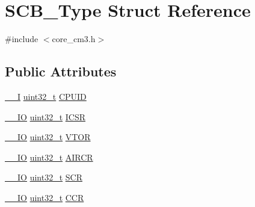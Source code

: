 \hypertarget{struct_s_c_b___type}{}\section{S\+C\+B\+\_\+\+Type Struct Reference}
\label{struct_s_c_b___type}


{\ttfamily \#include $<$core\+\_\+cm3.\+h$>$}

\subsection*{Public Attributes}
\begin{DoxyCompactItemize}
\item 
\hyperlink{group___c_m_s_i_s___c_m3__core__definitions_gaf63697ed9952cc71e1225efe205f6cd3}{\+\_\+\+\_\+I} \hyperlink{_p_e___types_8h_a33594304e786b158f3fb30289278f5af}{uint32\+\_\+t} \hyperlink{struct_s_c_b___type_afa7a9ee34dfa1da0b60b4525da285032}{C\+P\+U\+ID}
\item 
\hyperlink{group___c_m_s_i_s___c_m3__core__definitions_gaec43007d9998a0a0e01faede4133d6be}{\+\_\+\+\_\+\+IO} \hyperlink{_p_e___types_8h_a33594304e786b158f3fb30289278f5af}{uint32\+\_\+t} \hyperlink{struct_s_c_b___type_a3e66570ab689d28aebefa7e84e85dc4a}{I\+C\+SR}
\item 
\hyperlink{group___c_m_s_i_s___c_m3__core__definitions_gaec43007d9998a0a0e01faede4133d6be}{\+\_\+\+\_\+\+IO} \hyperlink{_p_e___types_8h_a33594304e786b158f3fb30289278f5af}{uint32\+\_\+t} \hyperlink{struct_s_c_b___type_a0faf96f964931cadfb71cfa54e051f6f}{V\+T\+OR}
\item 
\hyperlink{group___c_m_s_i_s___c_m3__core__definitions_gaec43007d9998a0a0e01faede4133d6be}{\+\_\+\+\_\+\+IO} \hyperlink{_p_e___types_8h_a33594304e786b158f3fb30289278f5af}{uint32\+\_\+t} \hyperlink{struct_s_c_b___type_a6ed3c9064013343ea9fd0a73a734f29d}{A\+I\+R\+CR}
\item 
\hyperlink{group___c_m_s_i_s___c_m3__core__definitions_gaec43007d9998a0a0e01faede4133d6be}{\+\_\+\+\_\+\+IO} \hyperlink{_p_e___types_8h_a33594304e786b158f3fb30289278f5af}{uint32\+\_\+t} \hyperlink{struct_s_c_b___type_abfad14e7b4534d73d329819625d77a16}{S\+CR}
\item 
\hyperlink{group___c_m_s_i_s___c_m3__core__definitions_gaec43007d9998a0a0e01faede4133d6be}{\+\_\+\+\_\+\+IO} \hyperlink{_p_e___types_8h_a33594304e786b158f3fb30289278f5af}{uint32\+\_\+t} \hyperlink{struct_s_c_b___type_a6d273c6b90bad15c91dfbbad0f6e92d8}{C\+CR}
\item 

\end{DoxyCompactItemize}
